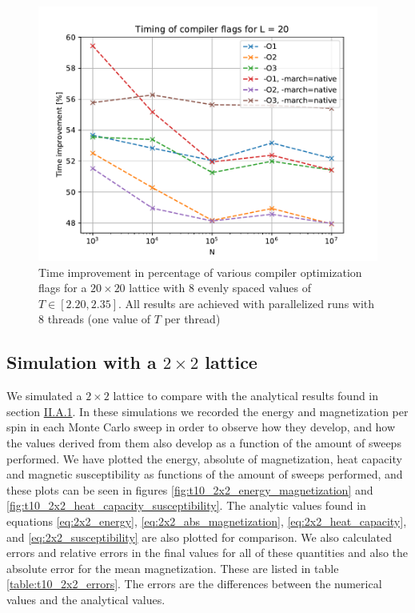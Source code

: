 \documentclass[reprint,english,notitlepage]{revtex4-1}  %
\begin{document}
\begin{figure}[H]
	\centering
	\includegraphics[width=\columnwidth]{../data/benchmark.pdf}
	\caption{Time improvement in percentage of various compiler optimization flags for a \(20\times 20\) lattice with \(8\) evenly spaced values of \(T \in [2.20, 2.35]\). All results are achieved with parallelized runs with \(8\) threads (one value of \(T\) per thread)} \label{fig:benchmark_compiler_flags}
\end{figure}



\subsection{Simulation with a $2\times 2$ lattice} \label{sec:IV:B}

We simulated a $2 \times 2$ lattice to compare with the analytical results found in section \hyperref[sec:II:A:i]{II.A.1}. In these simulations we recorded the energy and magnetization per spin in each Monte Carlo sweep in order to observe how they develop, and how the values derived from them also develop as a function of the amount of sweeps performed. We have plotted the energy, absolute of magnetization, heat capacity and magnetic susceptibility as functions of the amount of sweeps performed, and these plots can be seen in figures \ref{fig:t10_2x2_energy_magnetization} and \ref{fig:t10_2x2_heat_capacity_susceptibility}. The analytic values found in equations \eqref{eq:2x2_energy}, \eqref{eq:2x2_abs_magnetization}, \eqref{eq:2x2_heat_capacity}, and \eqref{eq:2x2_susceptibility} are also plotted for comparison. We also calculated errors and relative errors in the final values for all of these quantities and also the absolute error for the mean magnetization. These are listed in table \ref{table:t10_2x2_errors}. The errors are the differences between the numerical values and the analytical values.
\end{document}

